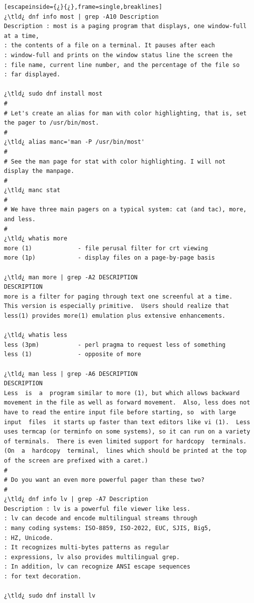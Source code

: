 \begin{lstlisting}[escapeinside={¿}{¿},frame=single,breaklines]
¿\tld¿ dnf info most | grep -A10 Description
Description : most is a paging program that displays, one window-full at a time,
: the contents of a file on a terminal. It pauses after each
: window-full and prints on the window status line the screen the
: file name, current line number, and the percentage of the file so
: far displayed.

¿\tld¿ sudo dnf install most
#
# Let's create an alias for man with color highlighting, that is, set the pager to /usr/bin/most.
#
¿\tld¿ alias manc='man -P /usr/bin/most'
#
# See the man page for stat with color highlighting. I will not display the manpage.
#
¿\tld¿ manc stat
#
# We have three main pagers on a typical system: cat (and tac), more, and less.
#
¿\tld¿ whatis more
more (1)             - file perusal filter for crt viewing
more (1p)            - display files on a page-by-page basis

¿\tld¿ man more | grep -A2 DESCRIPTION
DESCRIPTION
more is a filter for paging through text one screenful at a time.  This version is especially primitive.  Users should realize that less(1) provides more(1) emulation plus extensive enhancements.

¿\tld¿ whatis less
less (3pm)           - perl pragma to request less of something
less (1)             - opposite of more

¿\tld¿ man less | grep -A6 DESCRIPTION
DESCRIPTION
Less  is  a  program similar to more (1), but which allows backward movement in the file as well as forward movement.  Also, less does not have to read the entire input file before starting, so  with large  input  files  it starts up faster than text editors like vi (1).  Less uses termcap (or terminfo on some systems), so it can run on a variety of terminals.  There is even limited support for hardcopy  terminals. (On  a  hardcopy  terminal,  lines which should be printed at the top of the screen are prefixed with a caret.)
#
# Do you want an even more powerful pager than these two?
#
¿\tld¿ dnf info lv | grep -A7 Description
Description : lv is a powerful file viewer like less.
: lv can decode and encode multilingual streams through
: many coding systems: ISO-8859, ISO-2022, EUC, SJIS, Big5,
: HZ, Unicode.
: It recognizes multi-bytes patterns as regular
: expressions, lv also provides multilingual grep.
: In addition, lv can recognize ANSI escape sequences
: for text decoration.

¿\tld¿ sudo dnf install lv


\end{lstlisting}
